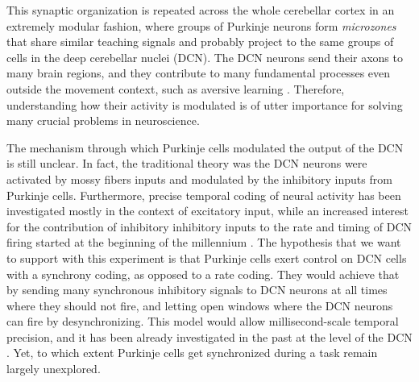 \begin{figure}[H]
  \centering
\end{figure}


This synaptic organization is repeated across the whole cerebellar cortex in an extremely modular fashion, where groups of Purkinje neurons form \emph{microzones} that share similar teaching signals and probably project to the same groups of cells in the deep cerebellar nuclei (DCN). The DCN neurons send their axons to many brain regions, and they contribute to many fundamental processes even outside the movement context, such as aversive learning \cite{frontera2020bidirectional}. Therefore, understanding how their activity is modulated is of utter importance for solving many crucial problems in neuroscience.

The mechanism through which Purkinje cells modulated the output of the DCN is still unclear. In fact, the traditional theory was the DCN neurons were activated by mossy fibers inputs and modulated by the inhibitory inputs from Purkinje cells. Furthermore, precise temporal coding of neural activity has been investigated mostly in the context of excitatory input, while an increased interest for the contribution of inhibitory inhibitory inputs to the rate and timing of DCN firing started at the beginning of the millennium \cite{person2012synchrony}. The hypothesis that we want to support with this experiment is that Purkinje cells exert control on DCN cells with a synchrony coding, as opposed to a rate coding. They would achieve that by sending many synchronous inhibitory signals to DCN neurons at all times where they should not fire, and letting open windows where the DCN neurons can fire by desynchronizing. This model would allow millisecond-scale temporal precision, and it has been already investigated in the past at the level of the DCN \cite{person2012synchrony}. Yet, to which extent Purkinje cells get synchronized during a task remain largely unexplored.

